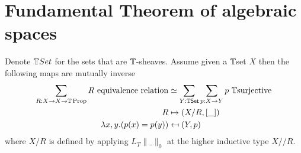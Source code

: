 \documentclass{article}
\begin{document}
\section{Fundamental Theorem of algebraic spaces}

\begin{lemma}\label{quotient-by-equivalence-relation}
Denote $\mathbb{T} Set$ for the sets that are $\mathbb{T}$-sheaves. Assume given a $\mathbb{T}$set  $X$ then the following maps are mutually inverse
\begin{align*}
\sum_{R:X\to X\to \bT\Prop} R\ \mathrm{equivalence\ relation} &\simeq \sum_{Y:\bT \mathrm{\Set}} \sum_{p:X\to Y} p\ \bT\mathrm{surjective} \\
R &\mapsto (X/R,[\_]) \\
 \lambda x,y.  (p(x)=p(y)) &\mapsfrom (Y,p) 
 \end{align*}
where $X / R$ is defined by applying $L_T \| \_ \|_0 $ at the higher inductive type $X // R$.
\end{lemma}
\end{document}
